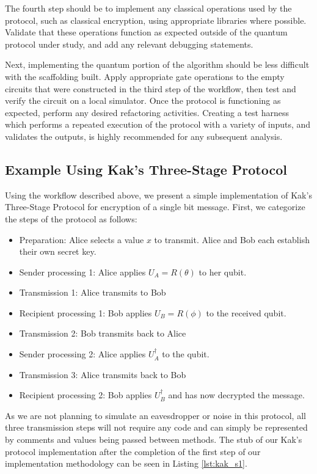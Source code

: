 \documentclass[sigconf]{acmart}
\begin{document}
The fourth step should be to implement any classical operations used by the protocol, such as classical encryption, using appropriate libraries where possible. Validate that these operations function as expected outside of the quantum protocol under study, and add any relevant debugging statements.

Next, implementing the quantum portion of the algorithm should be less difficult with the scaffolding built. %
Apply appropriate gate operations to the empty circuits that were constructed in the third step of the workflow, then test and verify the circuit on a local simulator. Once the protocol is functioning as expected, perform any desired refactoring activities. Creating a test harness which performs a repeated execution of the protocol with a variety of inputs, and validates the outputs, is highly recommended for any subsequent analysis.

\subsection{Example Using Kak's Three-Stage Protocol}
Using the workflow described above, we present a simple implementation of Kak's Three-Stage Protocol\cite{kak_three-stage_2006} for encryption of a single bit message. First, we categorize the steps of the protocol as follows:
\begin{itemize}
\item Preparation: Alice selects a value $x$ to transmit. Alice and Bob each establish their own secret key.
\item Sender processing 1: Alice applies $U_A = R(\theta)$ to her qubit.
\item Transmission 1: Alice transmits to Bob
\item Recipient processing 1: Bob applies $U_B = R(\phi)$ to the received qubit.
\item Transmission 2: Bob transmits back to Alice
\item Sender processing 2: Alice applies $U^\dagger_A$ to the qubit.
\item Transmission 3: Alice transmits back to Bob
\item Recipient processing 2: Bob applies $U^\dagger_B$ and has now decrypted the message.
\end{itemize}
As we are not planning to simulate an eavesdropper or noise in this protocol, all three transmission steps will not require any code and can simply be represented by comments and values being passed between methods. The stub of our Kak's protocol implementation after the completion of the first step of our implementation methodology can be seen in Listing \ref{lst:kak_s1}.
\end{document}
